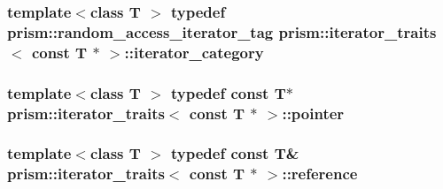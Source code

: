 \subsubsection[{\texorpdfstring{iterator\+\_\+category}{iterator_category}}]{\setlength{\rightskip}{0pt plus 5cm}template$<$class T $>$ typedef {\bf prism\+::random\+\_\+access\+\_\+iterator\+\_\+tag} {\bf prism\+::iterator\+\_\+traits}$<$ const T $\ast$ $>$\+::{\bf iterator\+\_\+category}}\hypertarget{structprism_1_1iterator__traits_3_01const_01_t_01_5_01_4_a061fcd33f78e06542543becbc9dbebba}{}\label{structprism_1_1iterator__traits_3_01const_01_t_01_5_01_4_a061fcd33f78e06542543becbc9dbebba}
\subsubsection[{\texorpdfstring{pointer}{pointer}}]{\setlength{\rightskip}{0pt plus 5cm}template$<$class T $>$ typedef const T$\ast$ {\bf prism\+::iterator\+\_\+traits}$<$ const T $\ast$ $>$\+::{\bf pointer}}\hypertarget{structprism_1_1iterator__traits_3_01const_01_t_01_5_01_4_a311fcece25b4ccff83c3d6adc1985643}{}\label{structprism_1_1iterator__traits_3_01const_01_t_01_5_01_4_a311fcece25b4ccff83c3d6adc1985643}
\subsubsection[{\texorpdfstring{reference}{reference}}]{\setlength{\rightskip}{0pt plus 5cm}template$<$class T $>$ typedef const T\& {\bf prism\+::iterator\+\_\+traits}$<$ const T $\ast$ $>$\+::{\bf reference}}\hypertarget{structprism_1_1iterator__traits_3_01const_01_t_01_5_01_4_ab021c97edb3c26a369607875c59cd0cc}{}\label{structprism_1_1iterator__traits_3_01const_01_t_01_5_01_4_ab021c97edb3c26a369607875c59cd0cc}
